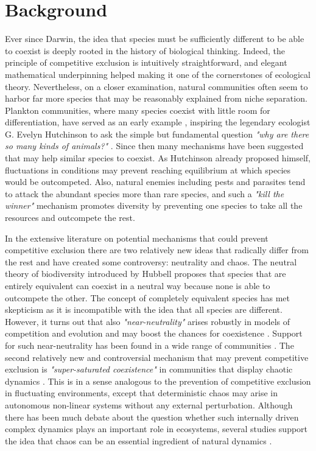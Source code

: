 \section{Background}
\label{sec:Background}
Ever since Darwin, the idea that species must be sufficiently different to be able to coexist is deeply rooted in the history of biological thinking. Indeed, the principle of competitive exclusion is intuitively straightforward, and elegant mathematical underpinning\cite{MacArthur} helped making it one of the cornerstones of ecological theory. Nevertheless, on a closer examination, natural communities often seem to harbor far more species that may be reasonably explained from niche separation. Plankton communities, where many species coexist with little room for differentiation, have served as an early example \cite{Hutchinson, Hutchinson1961}, inspiring the legendary ecologist G. Evelyn Hutchinson to ask the simple but fundamental question \textit{"why are there so many kinds of animals?"} \cite{Hutchinson1961}. Since then many mechanisms have been suggested that may help similar species to coexist. As Hutchinson already proposed himself, fluctuations in conditions may prevent reaching equilibrium at which species would be outcompeted. Also, natural enemies including pests and parasites tend to attack the abundant species more than rare species, and such a \textit{"kill the winner"}\cite{Winter2010} mechanism promotes diversity by preventing one species to take all the resources and outcompete the rest.

In the extensive literature on potential mechanisms that could prevent competitive exclusion there are two relatively new ideas that radically differ from the rest and have created some controversy: neutrality and chaos. The neutral theory of biodiversity introduced by Hubbell \cite{Hubbell2001} proposes that species that are entirely equivalent can coexist in a neutral way because none is able to outcompete the other. The concept of completely equivalent species has met skepticism as it is incompatible with the idea that all species are different. However, it turns out that also \textit{"near-neutrality"} arises robustly in models of competition and evolution and may boost the chances for coexistence \cite{Scheffer2006, Scheffer2018, Fort2009, Fort2010}. Support for such near-neutrality has been found in a wide range of communities \cite{Scheffer2006, Vergnon2013, Scheffera, Segura2013, Vergnon2012}. The second relatively new and controversial mechanism that may prevent competitive exclusion is \textit{"super-saturated coexistence"} in communities that display chaotic dynamics \cite{Huisman1999}. This is in a sense analogous to the prevention of competitive exclusion in fluctuating environments, except that deterministic chaos may arise in autonomous non-linear systems without any external perturbation. Although there has been much debate about the question whether such internally driven complex dynamics plays an important role in ecosystems, several studies support the idea that chaos can be an essential ingredient of natural dynamics \cite{Huisman1999, Beninca2008, Dakos2009b}.

